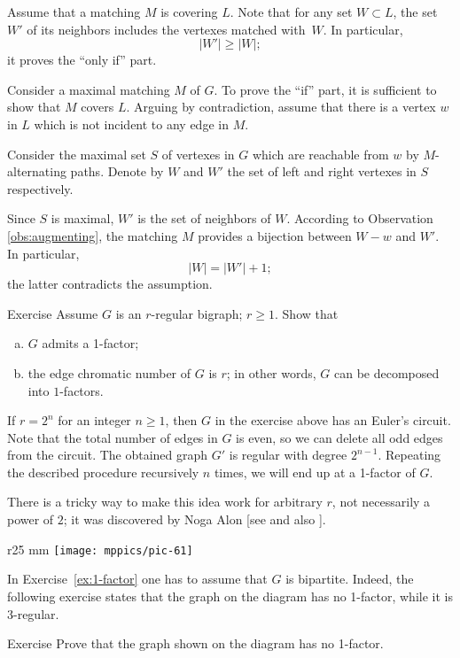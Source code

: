Assume that a matching $M$ is covering $L$.
Note that for any set  $W\subset L$, the set $W'$ of its neighbors includes the vertexes matched with~$W$.
In particular,
\[|W'|\ge |W|;\]
it proves the ``only if'' part.

Consider a maximal matching $M$ of $G$.
To prove the ``if'' part, it is sufficient to show that $M$ covers $L$.
Arguing by contradiction, assume that there is a vertex $w$ in $L$ which is not incident to any edge in $M$.

Consider the maximal set $S$ of vertexes in $G$ which are reachable from $w$ by 
$M$-alternating paths.
Denote by $W$ and $W'$ the set of left and right vertexes in $S$ respectively.

Since $S$ is maximal, $W'$ is the set of neighbors of $W$. 
According to Observation \ref{obs:augmenting}, the matching $M$ provides a bijection between $W-w$ and $W'$.
In particular, 
\[|W|=|W'|+1;\] 
the latter contradicts the assumption.
\qeds

\begin{thm}{Exercise}\label{ex:1-factor}
Assume $G$ is an $r$-regular bigraph; $r\ge 1$.
Show that 
\begin{enumerate}[(a)]
\item $G$ admits a 1-factor;
\item the edge chromatic number of $G$ is $r$; in other words, $G$ can be decomposed into $1$-factors.
\end{enumerate}

\end{thm}

If $r=2^n$ for an integer $n\ge 1$, then $G$ in the exercise above has an Euler's circuit. 
Note that the total number of edges in $G$ is even, so we can delete all odd edges from the circuit.
The obtained graph $G'$ is regular with degree $2^{n-1}$.
Repeating the described procedure recursively $n$ times, 
we will end up at a 1-factor of $G$.

There is a tricky way to make this idea work for arbitrary $r$, not necessarily a power of $2$; 
it was discovered by Noga Alon [see  and also ]. 

\medskip

{

\begin{wrapfigure}{r}{25 mm}
\vskip-6mm
\centering
\texttt{[image: mppics/pic-61]}
\vskip-0mm
\end{wrapfigure}

In Exercise~\ref{ex:1-factor} one has to assume that $G$ is bipartite.
Indeed, the following exercise states that the graph on the diagram has no 1-factor,
while it is 3-regular.

\begin{thm}{Exercise}
Prove that the graph shown on the diagram has no 1-factor.
\end{thm}

}

